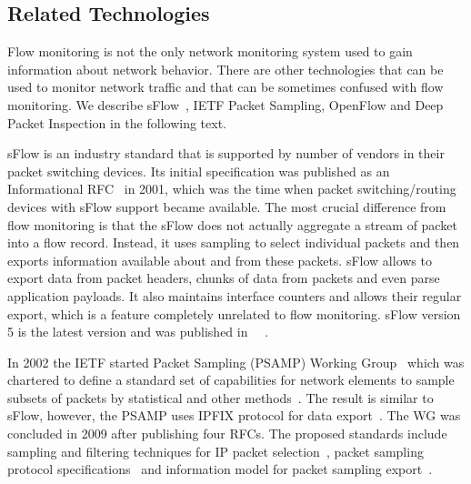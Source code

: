 \subsection{Related Technologies}

Flow monitoring is not the only network monitoring system used to gain information about network behavior. There are other technologies that can be used to monitor network traffic and that can be sometimes confused with flow monitoring. We describe sFlow~\cite{Phaal-2004-sFlow}, IETF Packet Sampling, OpenFlow and Deep Packet Inspection in the following text.

sFlow is an industry standard that is supported by number of vendors in their packet switching devices. Its initial specification was published as an Informational RFC~\cite{rfc3176} in 2001, which was the time when packet switching/routing devices with sFlow support became available. The most crucial difference from flow monitoring is that the sFlow does not actually aggregate a stream of packet into a flow record. Instead, it uses sampling to select individual packets and then exports information available about and from these packets. sFlow allows to export data from packet headers, chunks of data from packets and even parse application payloads. It also maintains interface counters and allows their regular export, which is a feature completely unrelated to flow monitoring. sFlow version 5 is the latest version and was published in ~\citeyear{Phaal-2004-sFlow}~\cite{Phaal-2004-sFlow}.

In 2002 the IETF started Packet Sampling (PSAMP) Working Group~\cite{IETF--Packet} which was chartered to define a standard set of capabilities for network elements to sample subsets of packets by statistical and other methods~\cite{IESG--Packet}. The result is similar to sFlow, however, the PSAMP uses IPFIX protocol for data export~\cite{rfc5477}. The WG was concluded in 2009 after publishing four RFCs. The proposed standards include sampling and filtering techniques for IP packet selection~\cite{rfc5475}, packet sampling protocol specifications~\cite{rfc5476} and information model for packet sampling export~\cite{rfc5477}.

